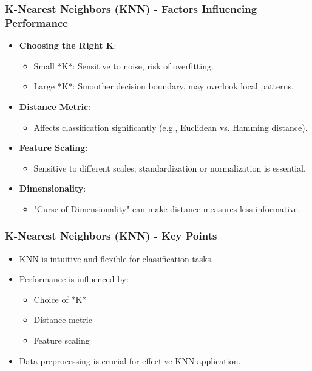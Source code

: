\documentclass{beamer}
\begin{document}
\begin{frame}[fragile]
    \frametitle{K-Nearest Neighbors (KNN) - Factors Influencing Performance}
    \begin{itemize}
        \item \textbf{Choosing the Right K}:
        \begin{itemize}
            \item Small *K*: Sensitive to noise, risk of overfitting.
            \item Large *K*: Smoother decision boundary, may overlook local patterns.
        \end{itemize}
        \item \textbf{Distance Metric}:
        \begin{itemize}
            \item Affects classification significantly (e.g., Euclidean vs. Hamming distance).
        \end{itemize}
        \item \textbf{Feature Scaling}:
        \begin{itemize}
            \item Sensitive to different scales; standardization or normalization is essential.
        \end{itemize}
        \item \textbf{Dimensionality}:
        \begin{itemize}
            \item "Curse of Dimensionality" can make distance measures less informative.
        \end{itemize}
    \end{itemize}
\end{frame}

\begin{frame}[fragile]
    \frametitle{K-Nearest Neighbors (KNN) - Key Points}
    \begin{itemize}
        \item KNN is intuitive and flexible for classification tasks.
        \item Performance is influenced by:
        \begin{itemize}
            \item Choice of *K*
            \item Distance metric
            \item Feature scaling
        \end{itemize}
        \item Data preprocessing is crucial for effective KNN application.
    \end{itemize}
\end{frame}
\end{document}
